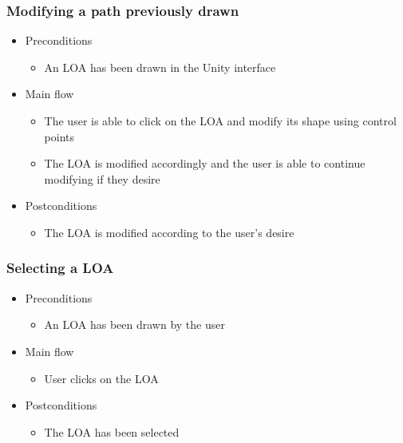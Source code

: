 \subsubsection{Modifying a path previously drawn}
    \begin{itemize}
    \item Preconditions
        \begin{itemize}
            \item An LOA has been drawn in the Unity interface
        \end{itemize}
    \end{itemize}
    \begin{itemize}
        \item Main flow
        \begin{itemize}
            \item The user is able to click on the LOA and modify its shape using control points
            \item The LOA is modified accordingly and the user is able to continue modifying if they desire
        \end{itemize}
    \end{itemize}
    \begin{itemize}
        \item Postconditions
        \begin{itemize}
            \item The LOA is modified according to the user’s desire
        \end{itemize}
    \end{itemize}

\subsubsection{Selecting a LOA}
    \begin{itemize}
    \item Preconditions
        \begin{itemize}
            \item An LOA has been drawn by the user
        \end{itemize}
    \end{itemize}
    \begin{itemize}
        \item Main flow
        \begin{itemize}
            \item User clicks on the LOA
        \end{itemize}
    \end{itemize}
    \begin{itemize}
        \item Postconditions
        \begin{itemize}
            \item The LOA has been selected
        \end{itemize}
    \end{itemize}

